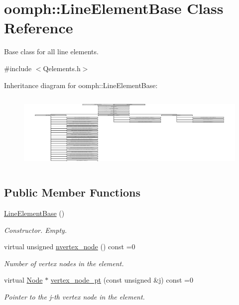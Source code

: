 \hypertarget{classoomph_1_1LineElementBase}{}\section{oomph\+:\+:Line\+Element\+Base Class Reference}
\label{classoomph_1_1LineElementBase}


Base class for all line elements.  




{\ttfamily \#include $<$Qelements.\+h$>$}

Inheritance diagram for oomph\+:\+:Line\+Element\+Base\+:\begin{figure}[H]
\begin{center}
\leavevmode
\includegraphics[height=3.789474cm]{classoomph_1_1LineElementBase}
\end{center}
\end{figure}
\subsection*{Public Member Functions}
\begin{DoxyCompactItemize}
\item 
\hyperlink{classoomph_1_1LineElementBase_a39c0e003c2b1569e7f33fdfbc47c79e4}{Line\+Element\+Base} ()
\begin{DoxyCompactList}\small\item\em Constructor. Empty. \end{DoxyCompactList}\item 
virtual unsigned \hyperlink{classoomph_1_1LineElementBase_ad80307523c850d58bca7b925df15e46d}{nvertex\+\_\+node} () const =0
\begin{DoxyCompactList}\small\item\em Number of vertex nodes in the element. \end{DoxyCompactList}\item 
virtual \hyperlink{classoomph_1_1Node}{Node} $\ast$ \hyperlink{classoomph_1_1LineElementBase_ab878e4c4276da4cefa4302cff8a7e6f8}{vertex\+\_\+node\+\_\+pt} (const unsigned \&j) const =0
\begin{DoxyCompactList}\small\item\em Pointer to the j-\/th vertex node in the element. \end{DoxyCompactList}\end{DoxyCompactItemize}
